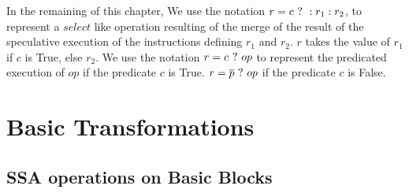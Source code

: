In the remaining of this chapter, We use the notation $r = c ~?~ :r_1:r_2$, to represent a $select$ like operation resulting of the merge of the result of the speculative execution of the instructions defining $r_1$ and $r_2$. $r$ takes the value of $r_1$ if $c$ is True, else $r_2$. We use the notation $r = c ~?~ op$ to represent the predicated execution of $op$ if the predicate $c$ is True. $r = \overline{p} ~?~ op$ if the predicate $c$ is False.

\section{Basic Transformations}

\subsection{SSA operations on Basic Blocks}

